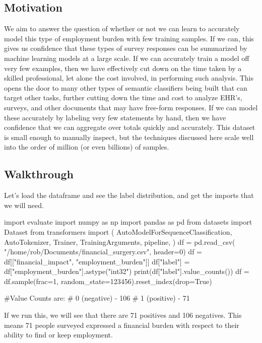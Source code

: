 \subsection{Motivation}
We aim to answer the question of whether or not we can learn to accurately model this type of employment burden with few training samples. If we can, this gives us confidence that these types of survey responses
can be summarized by machine learning models at a large scale. If we can accurately train a model off very few examples, then we have effectively cut down on the time taken by a skilled professional, let alone the cost involved,
in performing such analysis. This opens the door to many other types of semantic classifiers being built that can target other tasks, further cutting down the time and cost to analyze EHR's, surveys, and other documents that may
have free-form responses. If we can model these accurately by labeling very few statements by hand, then we have confidence that we can aggregate over totals quickly and accurately.
This dataset is small enough to manually inspect, but the techniques discussed here scale well into the order of million (or even billions) of samples.


\subsection{Walkthrough}

Let's load the dataframe and see the label distribution, and get the imports that we will need.

\begin{python}

import evaluate
import numpy as np
import pandas as pd
from datasets import Dataset
from transformers import (
    AutoModelForSequenceClassification,
    AutoTokenizer,
    Trainer,
    TrainingArguments,
    pipeline,
)
df = pd.read_csv(
    "/home/rob/Documents/financial_surgery.csv",
    header=0)
df = df[["financial_impact", "employment_burden"]]
df["label"] = df["employment_burden"].astype("int32")
print(df["label"].value_counts())
df = df.sample(frac=1,
    random_state=123456).reset_index(drop=True)

#Value Counts are:
# 0 (negative) - 106
# 1 (positive) - 71
\end{python}

If we run this, we will see that there are 71 positives and 106 negatives. This means 71 people surveyed expressed a financial burden
with respect to their ability to find or keep employment.

